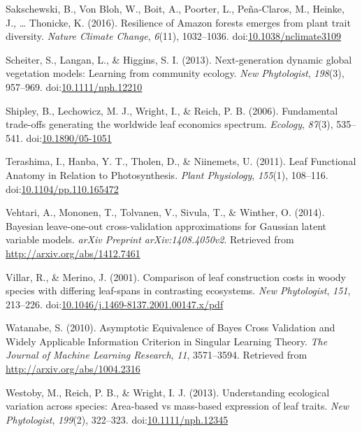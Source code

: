\documentclass[12pt,]{article}
\theoremstyle{definition}
\theoremstyle{definition}
\theoremstyle{definition}
\theoremstyle{remark}
\begin{document}
\leavevmode\hypertarget{ref-Sakschewski2016}{}%
Sakschewski, B., Von Bloh, W., Boit, A., Poorter, L., Peña-Claros, M.,
Heinke, J., \ldots{} Thonicke, K. (2016). Resilience of Amazon forests
emerges from plant trait diversity. \emph{Nature Climate Change},
\emph{6}(11), 1032--1036.
doi:\href{https://doi.org/10.1038/nclimate3109}{10.1038/nclimate3109}

\leavevmode\hypertarget{ref-Scheiter2013}{}%
Scheiter, S., Langan, L., \& Higgins, S. I. (2013). Next-generation
dynamic global vegetation models: Learning from community ecology.
\emph{New Phytologist}, \emph{198}(3), 957--969.
doi:\href{https://doi.org/10.1111/nph.12210}{10.1111/nph.12210}

\leavevmode\hypertarget{ref-Shipley2006}{}%
Shipley, B., Lechowicz, M. J., Wright, I., \& Reich, P. B. (2006).
Fundamental trade-offs generating the worldwide leaf economics spectrum.
\emph{Ecology}, \emph{87}(3), 535--541.
doi:\href{https://doi.org/10.1890/05-1051}{10.1890/05-1051}

\leavevmode\hypertarget{ref-Terashima2011}{}%
Terashima, I., Hanba, Y. T., Tholen, D., \& Niinemets, U. (2011). Leaf
Functional Anatomy in Relation to Photosynthesis. \emph{Plant
Physiology}, \emph{155}(1), 108--116.
doi:\href{https://doi.org/10.1104/pp.110.165472}{10.1104/pp.110.165472}

\leavevmode\hypertarget{ref-Vehtari2014}{}%
Vehtari, A., Mononen, T., Tolvanen, V., Sivula, T., \& Winther, O.
(2014). Bayesian leave-one-out cross-validation approximations for
Gaussian latent variable models. \emph{arXiv Preprint
arXiv:1408.4050v2}. Retrieved from \url{http://arxiv.org/abs/1412.7461}

\leavevmode\hypertarget{ref-Villar2001}{}%
Villar, R., \& Merino, J. (2001). Comparison of leaf construction costs
in woody species with differing leaf-spans in contrasting ecosystems.
\emph{New Phytologist}, \emph{151}, 213--226.
doi:\href{https://doi.org/10.1046/j.1469-8137.2001.00147.x/pdf}{10.1046/j.1469-8137.2001.00147.x/pdf}

\leavevmode\hypertarget{ref-Watanabe2010}{}%
Watanabe, S. (2010). Asymptotic Equivalence of Bayes Cross Validation
and Widely Applicable Information Criterion in Singular Learning Theory.
\emph{The Journal of Machine Learning Research}, \emph{11}, 3571--3594.
Retrieved from \url{http://arxiv.org/abs/1004.2316}

\leavevmode\hypertarget{ref-Westoby2013}{}%
Westoby, M., Reich, P. B., \& Wright, I. J. (2013). Understanding
ecological variation across species: Area-based vs mass-based expression
of leaf traits. \emph{New Phytologist}, \emph{199}(2), 322--323.
doi:\href{https://doi.org/10.1111/nph.12345}{10.1111/nph.12345}
\end{document}
